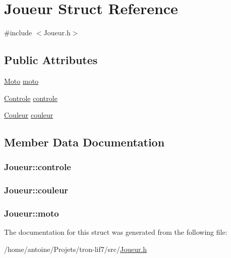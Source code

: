 \hypertarget{structJoueur}{\section{Joueur Struct Reference}
\label{structJoueur}
}


{\ttfamily \#include $<$Joueur.\-h$>$}

\subsection*{Public Attributes}
\begin{DoxyCompactItemize}
\item 
\hyperlink{structMoto}{Moto} \hyperlink{structJoueur_ac2768294956259e01d0744d6db789fe2}{moto}
\item 
\hyperlink{structControle}{Controle} \hyperlink{structJoueur_a9e673b161d97d9530f7ff108d5ea8b52}{controle}
\item 
\hyperlink{Couleur_8h_aa304d0ca681f782b1d7735da33037dd7}{Couleur} \hyperlink{structJoueur_a966bbda4413e0b0d7aaf109660926639}{couleur}
\end{DoxyCompactItemize}


\subsection{Member Data Documentation}
\hypertarget{structJoueur_a9e673b161d97d9530f7ff108d5ea8b52}{
\subsubsection[{controle}]{ Joueur\-::controle}}\label{structJoueur_a9e673b161d97d9530f7ff108d5ea8b52}
\hypertarget{structJoueur_a966bbda4413e0b0d7aaf109660926639}{
\subsubsection[{couleur}]{ Joueur\-::couleur}}\label{structJoueur_a966bbda4413e0b0d7aaf109660926639}
\hypertarget{structJoueur_ac2768294956259e01d0744d6db789fe2}{
\subsubsection[{moto}]{ Joueur\-::moto}}\label{structJoueur_ac2768294956259e01d0744d6db789fe2}


The documentation for this struct was generated from the following file\-:\begin{DoxyCompactItemize}
\item 
/home/antoine/\-Projets/tron-\/lif7/src/\hyperlink{Joueur_8h}{Joueur.\-h}\end{DoxyCompactItemize}
